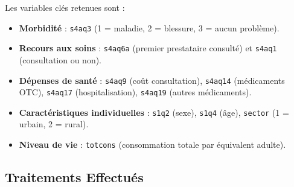 \documentclass[
  11pt,
]{article}
\begin{document}
Les variables clés retenues sont :

\begin{itemize}
\item
  \textbf{Morbidité} : \texttt{s4aq3} (1 = maladie, 2 = blessure, 3 =
  aucun problème).
\item
  \textbf{Recours aux soins} : \texttt{s4aq6a} (premier prestataire
  consulté) et \texttt{s4aq1} (consultation ou non).
\item
  \textbf{Dépenses de santé} : \texttt{s4aq9} (coût consultation),
  \texttt{s4aq14} (médicaments OTC), \texttt{s4aq17} (hospitalisation),
  \texttt{s4aq19} (autres médicaments).
\item
  \textbf{Caractéristiques individuelles} : \texttt{s1q2} (sexe),
  \texttt{s1q4} (âge), \texttt{sector} (1 = urbain, 2 = rural).
\item
  \textbf{Niveau de vie} : \texttt{totcons} (consommation totale par
  équivalent adulte).
\end{itemize}

\subsection{Traitements Effectués}\label{traitements-effectuuxe9s}
\end{document}
